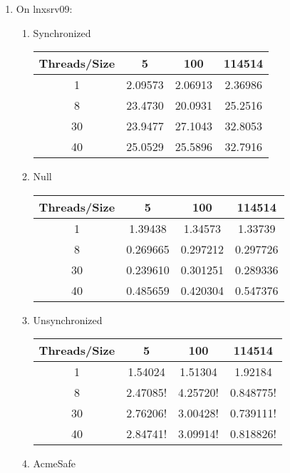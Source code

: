 \begin{enumerate}
  \item   
  On lnxsrv09:
  \begin{enumerate}
    \item 
    Synchronized
    \begin{center}
      \begin{tabular}{|c|c|c|c|}
      \hline
        Threads/Size & 5 & 100 & 114514 \\
      \hline 1 & 2.09573 & 2.06913 & 2.36986 \\
      \hline 8 & 23.4730 & 20.0931 & 25.2516 \\
      \hline 30 & 23.9477 & 27.1043 & 32.8053 \\
      \hline 40 & 25.0529 & 25.5896 & 32.7916 \\
      \hline
      \end{tabular}
    \end{center}
    \item 
    Null
    \begin{center}
      \begin{tabular}{|c|c|c|c|}
      \hline
        Threads/Size & 5 & 100 & 114514 \\
      \hline 1 & 1.39438 & 1.34573 & 1.33739 \\
      \hline 8 & 0.269665 & 0.297212 & 0.297726 \\
      \hline 30 & 0.239610 & 0.301251 & 0.289336 \\
      \hline 40 & 0.485659 & 0.420304 & 0.547376 \\
      \hline
      \end{tabular}
    \end{center}
    \item 
    Unsynchronized
    \begin{center}
      \begin{tabular}{|c|c|c|c|}
      \hline
        Threads/Size & 5 & 100 & 114514 \\
      \hline 1 & 1.54024 & 1.51304 & 1.92184 \\
      \hline 8 & 2.47085! & 4.25720! & 0.848775! \\
      \hline 30 & 2.76206! & 3.00428! & 0.739111! \\
      \hline 40 & 2.84741! & 3.09914! & 0.818826! \\
      \hline
      \end{tabular}
    \end{center}
    \item 
    AcmeSafe 
    \begin{center}

\end{center}
\end{enumerate}
\end{enumerate}
